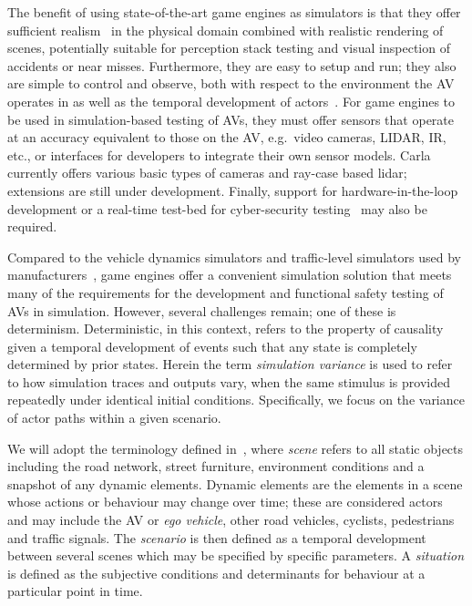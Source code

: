 \documentclass[letterpaper, 10 pt, journal, twoside]{IEEEtran}
\begin{document}
The benefit of using state-of-the-art game engines as simulators is that they offer sufficient realism~\cite{Koopman2018} in the physical domain combined with realistic rendering of scenes, potentially suitable for perception stack testing and visual inspection of accidents or near misses. 
%
Furthermore, they are easy to setup and run; they also are simple to control and observe, both with respect to the environment the AV operates in as well as the temporal development of actors~\cite{Ulbrich2015}. 
%
For game engines to be used in simulation-based testing of AVs, they must offer sensors that operate at an accuracy equivalent to those on the AV, e.g.\ video cameras, LIDAR, IR, etc., or interfaces for developers to integrate their own sensor models. Carla currently offers various basic types of cameras and ray-case based lidar; extensions are still under development. 
%
Finally, support for hardware-in-the-loop development or a real-time test-bed for cyber-security testing~\cite{Javaid2013} may also be required. 

Compared to the vehicle dynamics simulators and traffic-level simulators used by manufacturers~\cite{FrameworkAndChallenges}, game engines offer a convenient simulation solution that meets many of the requirements for the development and functional safety testing of AVs in simulation. However, several challenges remain; one of these is determinism.
%
Deterministic, in this context, refers to the property of causality given a temporal development of events such that any state is completely determined by prior states.
%
Herein the term \textit{simulation variance} is used to refer to how simulation traces and outputs vary, when the same stimulus is provided repeatedly under identical initial conditions. Specifically, we focus on the variance of actor paths within a given scenario. 

We will adopt the terminology defined in~\cite{Ulbrich2015}, where \textit{scene} refers to all static objects including the road network, street furniture, environment conditions and a snapshot of any dynamic elements. Dynamic elements are the elements in a scene whose actions or behaviour may change over time; these are considered actors and may include the AV or \textit{ego vehicle}, other road vehicles, cyclists, pedestrians and traffic signals. The \textit{scenario} is then defined as a temporal development between several scenes which may be specified by specific parameters. A \textit{situation} is defined as the subjective conditions and determinants for behaviour at a particular point in time.
\end{document}
